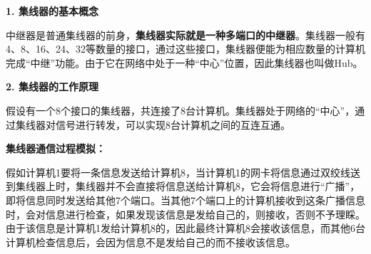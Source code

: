 \textbf{{1. 集线器的基本概念}}

中继器是普通集线器的前身，\textbf{{集线器实际就是一种多端口的中继器}}。{集线器一般有4、8、16、24、32等数量的接口，通过这些接口，集线器便能为相应数量的计算机完成``中继''功能。由于它在网络中处于一种``中心''位置，因此集线器也叫做Hub。}

{\textbf{2. 集线器的工作原理}}

假设有一个8个接口的集线器，共连接了8台计算机。集线器处于网络的``中心''，通过集线器对信号进行转发，可以实现8台计算机之间的互连互通。

\textbf{集线器通信过程模拟：}

假如计算机1要将一条信息发送给计算机8，当计算机1的网卡将信息通过双绞线送到集线器上时，集线器并不会直接将信息送给计算机8，它会将信息进行``广播''，即将信息同时发送给其他7个端口。当其他7个端口上的计算机接收到这条广播信息时，会对信息进行检查，如果发现该信息是发给自己的，则接收，否则不予理睬。由于该信息是计算机1发给计算机8的，因此最终计算机8会接收该信息，而其他6台计算机检查信息后，会因为信息不是发给自己的而不接收该信息。

